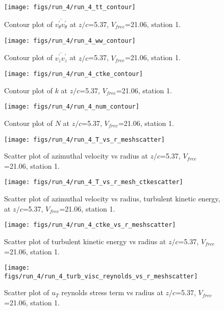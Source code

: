 \begin{figure}[H]
\centering
\texttt{[image: figs/run\_4/run\_4\_tt\_contour]}
\caption{Contour plot of $\overline{v_{\theta}^{\prime} v_{\theta}^{\prime}}$ at $z/c$=5.37, $V_{free}$=21.06, station 1.}
\end{figure}


\begin{figure}[H]
\centering
\texttt{[image: figs/run\_4/run\_4\_ww\_contour]}
\caption{Contour plot of $\overline{v_{z}^{\prime} v_{z}^{\prime}}$ at $z/c$=5.37, $V_{free}$=21.06, station 1.}
\end{figure}


\begin{figure}[H]
\centering
\texttt{[image: figs/run\_4/run\_4\_ctke\_contour]}
\caption{Contour plot of $k$ at $z/c$=5.37, $V_{free}$=21.06, station 1.}
\end{figure}


\begin{figure}[H]
\centering
\texttt{[image: figs/run\_4/run\_4\_num\_contour]}
\caption{Contour plot of $N$ at $z/c$=5.37, $V_{free}$=21.06, station 1.}
\end{figure}


\begin{figure}[H]
\centering
\texttt{[image: figs/run\_4/run\_4\_T\_vs\_r\_meshscatter]}
\caption{Scatter plot of azimuthal velocity vs radius at $z/c$=5.37, $V_{free}$=21.06, station 1.}
\end{figure}


\begin{figure}[H]
\centering
\texttt{[image: figs/run\_4/run\_4\_T\_vs\_r\_mesh\_ctkescatter]}
\caption{Scatter plot of azimuthal velocity vs radius, turbulent kinetic energy, at $z/c$=5.37, $V_{free}$=21.06, station 1.}
\end{figure}


\begin{figure}[H]
\centering
\texttt{[image: figs/run\_4/run\_4\_ctke\_vs\_r\_meshscatter]}
\caption{Scatter plot of turbulent kinetic energy vs radius at $z/c$=5.37, $V_{free}$=21.06, station 1.}
\end{figure}


\begin{figure}[H]
\centering
\texttt{[image: figs/run\_4/run\_4\_turb\_visc\_reynolds\_vs\_r\_meshscatter]}
\caption{Scatter plot of $
u_T$ reynolds stress term vs radius at $z/c$=5.37, $V_{free}$=21.06, station 1.}
\end{figure}


